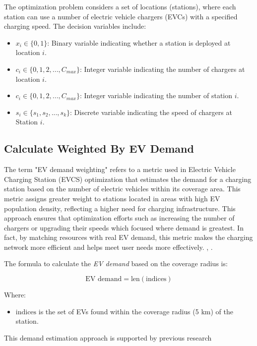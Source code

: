 The optimization problem considers a set of locations (stations), where each station can use a number of electric vehicle chargers (EVCs) with a specified charging speed. The decision variables include:

\begin{itemize}
    \item $x_i \in \{0,1\}$: Binary variable indicating whether a station is deployed at location $i$.
    \item $c_i \in \{0, 1, 2, ..., C_{max}\}$: Integer variable indicating the number of chargers at location $i$.
    \item $c_i \in \{0, 1, 2, ..., C_{max}\}$: Integer variable indicating the number of station $i$.
    \item $s_i \in \{s_1, s_2, ..., s_k\}$: Discrete variable indicating the speed of chargers at Station $i$.
\end{itemize}

\subsection{ Calculate Weighted By EV Demand}

The term "EV demand weighting" refers to a metric used in Electric Vehicle Charging Station (EVCS) optimization that estimates the demand for a charging station based on the number of electric vehicles within its coverage area. This metric assigns greater weight to stations located in areas with high EV population density, reflecting a higher need for charging infrastructure. This approach ensures that optimization efforts such as increasing the number of chargers or upgrading their speeds which focused where demand is greatest. In fact, by matching resources with real EV demand, this metric makes the charging network more efficient and helps meet user needs more effectively. \cite{Optimizing EV Charging Infrastructure}, \cite{Demand-based EV Charging Station Placement}.

The formula to calculate the \textit{EV demand} based on the coverage radius is:

\[
\text{EV demand} = \text{len} \left( \text{indices} \right)
\]

Where:
\begin{itemize}
    \item \(\text{indices}\) is the set of EVs found within the coverage radius (5 km) of the station.
\end{itemize}
This demand estimation approach is supported by previous research \cite{Demand-based EV Charging Station Placement}

